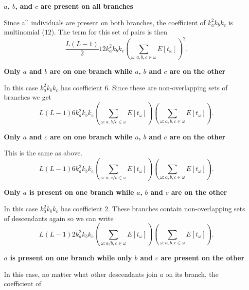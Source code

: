 \begin{flushleft}
  \textbf{$a$, $b$, and $c$ are present on all branches}\\
\end{flushleft}
Since all individuals are present on both branches, the coefficient of
$k_a^2k_bk_c$ is multinomial ($12$). The term for this set of pairs is then
\begin{equation*}
  \frac{L(L-1)}{2} 12 k_a^2k_bk_c \left( \sum_{\omega: a,b,c \in \omega} E[t_\omega] \right)^2.
\end{equation*}
\begin{flushleft}
  \textbf{Only $a$ and $b$ are on one branch while $a$, $b$ and $c$ are on the other}\\
\end{flushleft}
In this case $k_a^2k_bk_c$ has coefficient $6$. Since these are non-overlapping
sets of branches we get
\begin{equation*}
  L(L-1) 6 k_a^2k_bk_c \left( \sum_{\omega: a,b/c \in \omega} E[t_\omega] \right)
  \left( \sum_{\omega: a,b,c \in \omega} E[t_\omega] \right).
\end{equation*}
\begin{flushleft}
  \textbf{Only $a$ and $c$ are on one branch while $a$, $b$ and $c$ are on the other}\\
\end{flushleft}
This is the same as above.
\begin{equation*}
  L(L-1) 6 k_a^2k_bk_c \left( \sum_{\omega: a,c/b \in \omega} E[t_\omega] \right)
  \left( \sum_{\omega: a,b,c \in \omega} E[t_\omega] \right).
\end{equation*}
\begin{flushleft}
  \textbf{Only $a$ is present on one branch while $a$, $b$ and $c$ are on the other}\\
\end{flushleft}
In this case $k_a^2k_bk_c$ has coefficient $2$. These branches contain
non-overlapping sets of descendants again so we can write
\begin{equation*}
  L(L-1) 2 k_a^2k_bk_c \left( \sum_{\omega: a/b,c \in \omega} E[t_\omega] \right)
  \left( \sum_{\omega: a,b,c \in \omega} E[t_\omega] \right).
\end{equation*}
\begin{flushleft}
  \textbf{$a$ is present on one branch while only $b$ and $c$ are present on the other}\\
\end{flushleft}
In this case, no matter what other descendants join $a$ on its branch, the coefficient of
